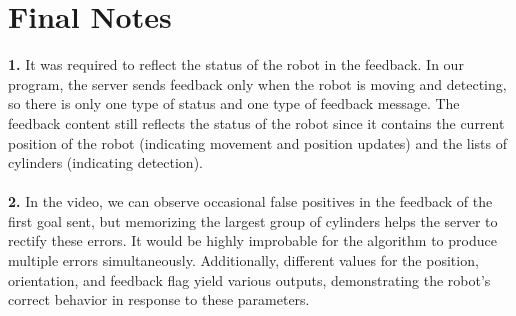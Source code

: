 \section{Final Notes}
\textbf{1.} It was required to reflect the status of the robot in the feedback. In our program, the server sends feedback only when the robot is moving and detecting, so there is only one type of status and one type of feedback message. The feedback content still reflects the status of the robot since it contains the current position of the robot (indicating movement and position updates) and the lists of cylinders (indicating detection).\\\\

\textbf{2.} In the video, we can observe occasional false positives in the feedback of the first goal sent, but memorizing the largest group of cylinders helps the server to rectify these errors. It would be highly improbable for the algorithm to produce multiple errors simultaneously. Additionally, different values for the position, orientation, and feedback flag yield various outputs, demonstrating the robot's correct behavior in response to these parameters.
%